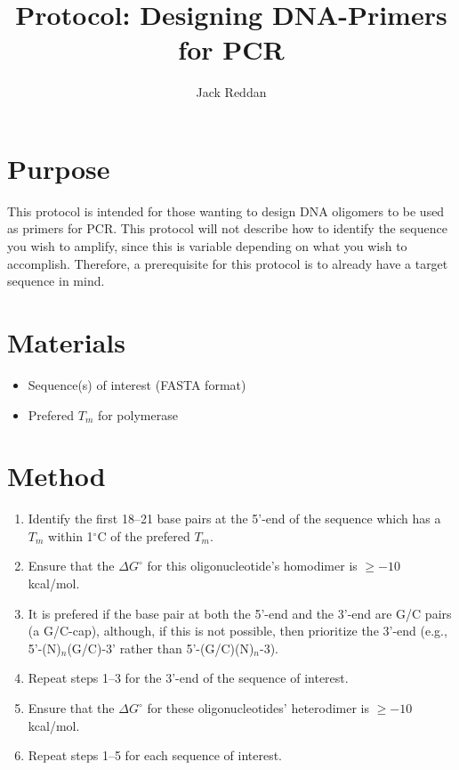 \documentclass[twocolumn]{article}
\begin{document}
\title{Protocol: Designing DNA-Primers for PCR}
\author{Jack Reddan}

\maketitle{}


\section{Purpose}
This protocol is intended for those wanting to design DNA oligomers to be used as primers for PCR.
This protocol will not describe how to identify the sequence you wish to amplify,
since this is variable depending on what you wish to accomplish.
Therefore, a prerequisite for this protocol is to already have a target sequence in mind.

\section{Materials}
\begin{itemize}
	\item Sequence(s) of interest (FASTA format)
	\item Prefered $T_m$ for polymerase
\end{itemize}

\section{Method}
\begin{enumerate}
	\item Identify the first 18--21 base pairs at the 5'-end of the sequence which has a $T_m$ within 1$^\circ$C of the prefered $T_m$.
	\item Ensure that the $\Delta G^\circ$ for this oligonucleotide's homodimer is $\ge -10$ kcal/mol.
	\item It is prefered if the base pair at both the 5'-end and the 3'-end are G/C pairs (a G/C-cap), although, if this is not possible, then prioritize the 3'-end (e.g., 5'-(N)$_n$(G/C)-3' rather than 5'-(G/C)(N)$_n$-3).
	\item Repeat steps 1--3 for the 3'-end of the sequence of interest.
	\item Ensure that the $\Delta G^\circ$ for these oligonucleotides' heterodimer is $\ge -10$ kcal/mol.
	\item Repeat steps 1--5 for each sequence of interest.
\end{enumerate}
\end{document}
